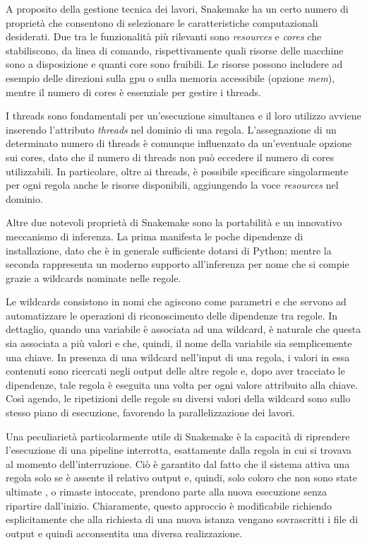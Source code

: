 A proposito della gestione tecnica dei lavori, Snakemake ha un certo numero di proprietà che consentono di selezionare le caratteristiche computazionali desiderati. 
Due tra le funzionalità più rilevanti sono \textit{resources} e \textit{cores} che stabiliscono, da linea di comando, rispettivamente quali risorse delle macchine sono a disposizione e quanti core sono fruibili.
Le risorse possono includere ad esempio delle direzioni sulla gpu o sulla memoria accessibile (opzione \textit{mem}), mentre il numero di cores è essenziale per gestire i threads.

I threads sono fondamentali per un'esecuzione simultanea e il loro utilizzo avviene inserendo l'attributo \textit{threads} nel dominio di una regola.
L'assegnazione di un determinato numero di threads è comunque influenzato da un'eventuale opzione sui cores, dato che il numero di threads non può eccedere il numero di cores utilizzabili.
In particolare, oltre ai threads, è possibile specificare singolarmente per ogni regola anche le risorse disponibili, aggiungendo la voce \textit{resources} nel dominio. 

Altre due notevoli proprietà di Snakemake sono la portabilità e un innovativo meccanismo di inferenza.
La prima manifesta le poche dipendenze di installazione, dato che è in generale sufficiente dotarsi di Python; mentre la seconda rappresenta un moderno supporto all'inferenza per nome che si compie grazie a wildcards nominate nelle regole.

Le wildcards consistono in nomi che agiscono come parametri e che servono ad automatizzare le operazioni di riconoscimento delle dipendenze tra regole. 
In dettaglio, quando una variabile è associata ad una wildcard, è naturale che questa sia associata a più valori e che, quindi, il nome della variabile sia semplicemente una chiave. 
In presenza di una wildcard nell'input di una regola, i valori in essa contenuti sono ricercati negli output delle altre regole e, dopo aver tracciato le dipendenze, tale regola è eseguita una volta per ogni valore attribuito alla chiave.
Così agendo, le ripetizioni delle regole su diversi valori della wildcard sono sullo stesso piano di esecuzione, favorendo la parallelizzazione dei lavori.   
  

Una peculiarietà particolarmente utile di Snakemake è la capacità di riprendere l'esecuzione di una pipeline interrotta, esattamente dalla regola in cui si trovava al momento dell'interruzione.
Ciò è garantito dal fatto che il sistema attiva una regola solo se è assente il relativo output e, quindi, solo coloro che non sono state ultimate , o rimaste intoccate, prendono parte alla nuova esecuzione senza ripartire dall'inizio.
Chiaramente, questo approccio è modificabile richiendo esplicitamente che alla richiesta di una nuova istanza vengano sovrascritti i file di output e quindi acconsentita una diversa realizzazione.

